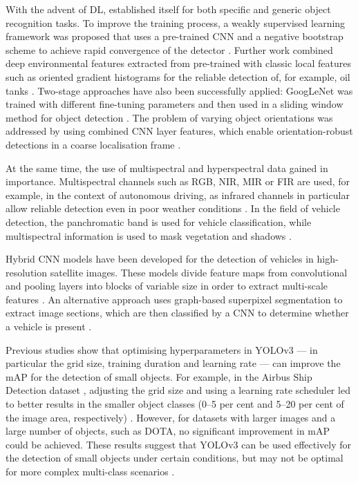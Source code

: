 With the advent of \Acrlong{DL},  established itself for both specific and generic object recognition tasks. To improve the training process, a weakly supervised learning framework was proposed that uses a pre-trained \acrshort{CNN} and a negative bootstrap scheme to achieve rapid convergence of the detector \cite{Zhou2016}. Further work combined deep environmental features extracted from pre-trained  with classic local features such as oriented gradient histograms \cite{Dalal2005} for the reliable detection of, for example, oil tanks \cite{Zhang2015}. Two-stage approaches have also been successfully applied: GoogLeNet was trained with different fine-tuning parameters and then used in a sliding window method for object detection \cite{Sevo2016}. The problem of varying object orientations was addressed by using combined \acrshort{CNN} layer features, which enable orientation-robust detections in a coarse localisation frame \cite{Zhu2015}.

At the same time, the use of multispectral and hyperspectral data gained in importance. Multispectral channels such as \acrshort{RGB}, \acrshort{NIR}, \Acrfull{MIR} or \Acrfull{FIR} are used, for example, in the context of autonomous driving, as infrared channels in particular allow reliable detection even in poor weather conditions \cite{Takumi2017}. In the field of vehicle detection, the panchromatic band is used for vehicle classification, while multispectral information is used to mask vegetation and shadows \cite{Eikvil2009}.

Hybrid \acrshort{CNN} models have been developed for the detection of vehicles in high-resolution satellite images. These models divide feature maps from convolutional and pooling layers into blocks of variable size in order to extract multi-scale features \cite{XueyunChen2014}. An alternative approach uses graph-based superpixel segmentation to extract image sections, which are then classified by a \acrshort{CNN} to determine whether a vehicle is present \cite{Jiang2015}.

Previous studies show that optimising hyperparameters in \acrshort{YOLO}v3  — in particular the grid size, training duration and learning rate — can improve the \acrfull{mAP} for the detection of small objects. For example, in the Airbus Ship Detection dataset \cite{Airbus_Ship_Det}, adjusting the grid size and using a learning rate scheduler led to better results in the smaller object classes (0–5 per cent and 5–20 per cent of the image area, respectively) \cite{Balzer2022}. However, for datasets with larger images and a large number of objects, such as \acrshort{DOTA}, no significant improvement in \acrshort{mAP} could be achieved. These results suggest that \acrshort{YOLO}v3 can be used effectively for the detection of small objects under certain conditions, but may not be optimal for more complex multi-class scenarios \cite{Balzer2022}.

